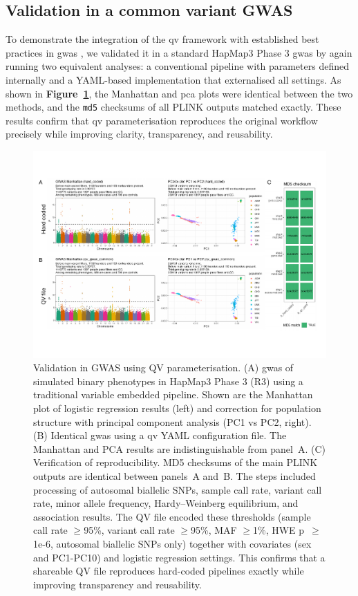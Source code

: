 \subsection{Validation in a common variant GWAS}

To demonstrate the integration of the \ac{qv} framework with established best practices in \ac{gwas} \cite{2021uffelmannGenomewideAssociationStudies}, we validated it in a standard HapMap3 Phase 3 \ac{gwas} by again running two equivalent analyses: a conventional pipeline with parameters defined internally and a YAML-based implementation that externalised all settings.
As shown in \textbf{Figure~\ref{fig:hapmap_gwas_validation}}, the Manhattan and \ac{pca} plots were identical between the two methods, and the \texttt{md5} checksums of all PLINK outputs matched exactly. These results confirm that \ac{qv} parameterisation reproduces the original workflow precisely while improving clarity, transparency, and reusability.

\begin{figure}[!h]
\centering
\includegraphics[width=\textwidth]{./images/hapmap_gwas_validation.pdf}
\caption{Validation in GWAS using QV parameterisation. 
(A) \ac{gwas} of simulated binary phenotypes in HapMap3 Phase 3 (R3) using a traditional variable embedded pipeline. Shown are the Manhattan plot of logistic regression results (left) and correction for population structure with principal component analysis (PC1 vs PC2, right). 
(B) Identical \ac{gwas} using a \ac{qv} YAML configuration file. The Manhattan and PCA results are indistinguishable from panel~A. 
(C) Verification of reproducibility. MD5 checksums of the main PLINK outputs are identical between panels~A and~B. The steps included processing of autosomal biallelic SNPs, sample call rate, variant call rate, minor allele frequency, Hardy–Weinberg equilibrium, and association results. The QV file encoded these thresholds (sample call rate $\geq$95\%, variant call rate $\geq$95\%, MAF $\geq$1\%, HWE p~$\geq$1e-6, autosomal biallelic SNPs only) together with covariates (sex and PC1-PC10) and logistic regression settings. This confirms that a shareable QV file reproduces hard-coded pipelines exactly while improving transparency and reusability.
}
    \label{fig:hapmap_gwas_validation}
\end{figure}

